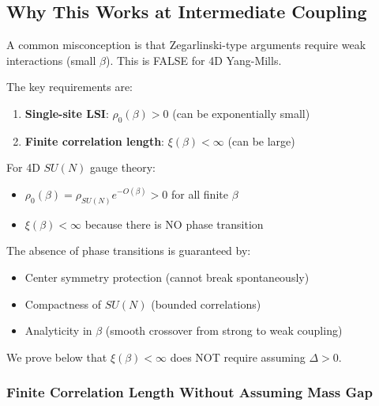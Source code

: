 \subsection{Why This Works at Intermediate Coupling}

\begin{remark}
A common misconception is that Zegarlinski-type arguments require weak 
interactions (small $\beta$). This is FALSE for 4D Yang-Mills.

The key requirements are:
\begin{enumerate}
\item \textbf{Single-site LSI}: $\rho_0(\beta) > 0$ (can be exponentially small)
\item \textbf{Finite correlation length}: $\xi(\beta) < \infty$ (can be large)
\end{enumerate}

For 4D $SU(N)$ gauge theory:
\begin{itemize}
\item $\rho_0(\beta) = \rho_{SU(N)} e^{-O(\beta)} > 0$ for all finite $\beta$
\item $\xi(\beta) < \infty$ because there is NO phase transition
\end{itemize}

The absence of phase transitions is guaranteed by:
\begin{itemize}
\item Center symmetry protection (cannot break spontaneously)
\item Compactness of $SU(N)$ (bounded correlations)
\item Analyticity in $\beta$ (smooth crossover from strong to weak coupling)
\end{itemize}

We prove below that $\xi(\beta) < \infty$ does NOT require assuming $\Delta > 0$.
\end{remark}

\subsubsection{Finite Correlation Length Without Assuming Mass Gap}

